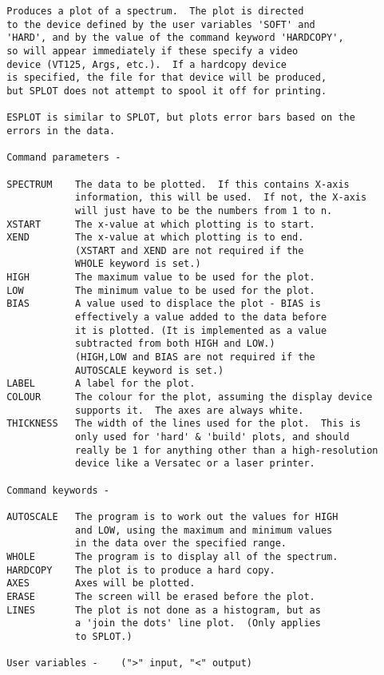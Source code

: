 \begin{description}
\begin{verbatim}
 Produces a plot of a spectrum.  The plot is directed
 to the device defined by the user variables 'SOFT' and
 'HARD', and by the value of the command keyword 'HARDCOPY',
 so will appear immediately if these specify a video
 device (VT125, Args, etc.).  If a hardcopy device
 is specified, the file for that device will be produced,
 but SPLOT does not attempt to spool it off for printing.

 ESPLOT is similar to SPLOT, but plots error bars based on the
 errors in the data.

 Command parameters -

 SPECTRUM    The data to be plotted.  If this contains X-axis
             information, this will be used.  If not, the X-axis
             will just have to be the numbers from 1 to n.
 XSTART      The x-value at which plotting is to start.
 XEND        The x-value at which plotting is to end.
             (XSTART and XEND are not required if the
             WHOLE keyword is set.)
 HIGH        The maximum value to be used for the plot.
 LOW         The minimum value to be used for the plot.
 BIAS        A value used to displace the plot - BIAS is
             effectively a value added to the data before
             it is plotted. (It is implemented as a value
             subtracted from both HIGH and LOW.)
             (HIGH,LOW and BIAS are not required if the
             AUTOSCALE keyword is set.)
 LABEL       A label for the plot.
 COLOUR      The colour for the plot, assuming the display device
             supports it.  The axes are always white.
 THICKNESS   The width of the lines used for the plot.  This is
             only used for 'hard' & 'build' plots, and should
             really be 1 for anything other than a high-resolution
             device like a Versatec or a laser printer.

 Command keywords -

 AUTOSCALE   The program is to work out the values for HIGH
             and LOW, using the maximum and minimum values
             in the data over the specified range.
 WHOLE       The program is to display all of the spectrum.
 HARDCOPY    The plot is to produce a hard copy.
 AXES        Axes will be plotted.
 ERASE       The screen will be erased before the plot.
 LINES       The plot is not done as a histogram, but as
             a 'join the dots' line plot.  (Only applies
             to SPLOT.)

 User variables -    (">" input, "<" output)


\end{verbatim}
\end{description}
